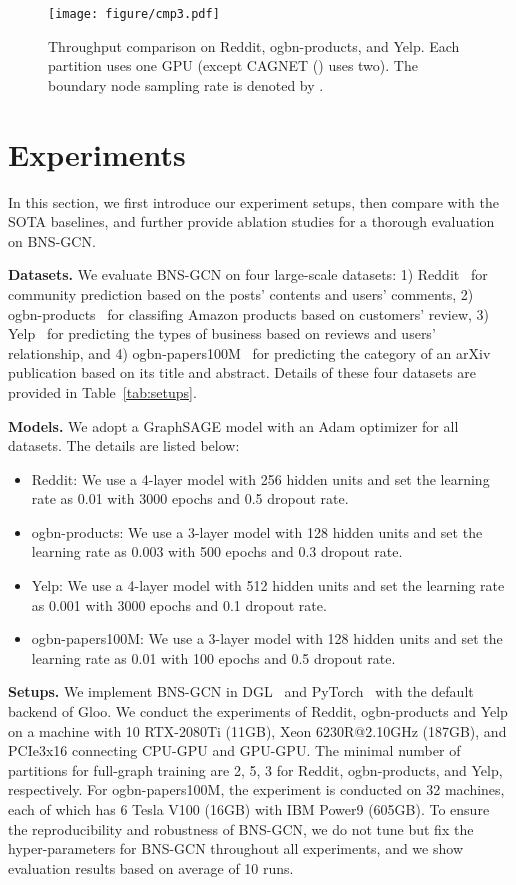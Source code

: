 \documentclass{article}
\newcommand{\niparagraph}[1]{\noindent\textbf{#1}}
\begin{document}
\begin{figure*}
  \centering
  \texttt{[image: figure/cmp3.pdf]}
  \caption{Throughput comparison on Reddit, ogbn-products, and Yelp. Each partition uses one GPU (except CAGNET () uses two). The boundary node sampling rate is denoted by .}
  \label{fig:cmp}
\end{figure*}


\section{Experiments}
\label{sec:experiment}  

In this section, we first introduce our experiment setups, then compare with the SOTA baselines, and further provide ablation studies for a thorough evaluation on BNS-GCN.


\niparagraph{Datasets.} We evaluate BNS-GCN on four large-scale datasets:
1) Reddit~\citep{hamilton2017inductive} for community prediction based on the posts' contents and users' comments,
2) ogbn-products~\citep{hu2020open} for classifing Amazon products based on customers' review,
3) Yelp~\citep{zeng2019graphsaint} for predicting the types of business based on reviews and users' relationship,
and 4) ogbn-papers100M~\citep{hu2020open} for predicting the category of an arXiv publication based on its title and abstract.
Details of these four datasets are provided in Table~\ref{tab:setups}.


\niparagraph{Models.}
\label{sec:model}
We adopt a GraphSAGE model with an Adam optimizer for all datasets. The details are listed below:
\begin{itemize}
    \item Reddit: We use a 4-layer model with 256 hidden units and set the learning rate as 0.01 with 3000 epochs and 0.5 dropout rate.
    \item ogbn-products: We use a 3-layer model with 128 hidden units and set the learning rate as 0.003 with 500 epochs and 0.3 dropout rate.
    \item Yelp: We use a 4-layer model with 512 hidden units and set the learning rate as 0.001 with 3000 epochs and 0.1 dropout rate.
    \item ogbn-papers100M: We use a 3-layer model with 128 hidden units and set the learning rate as 0.01 with 100 epochs and 0.5 dropout rate.
\end{itemize}


\niparagraph{Setups.} 
We implement BNS-GCN in DGL~\citep{wang2019dgl} and PyTorch~\citep{paszke2019pytorch} with the default backend of Gloo. 
We conduct the experiments of Reddit,  ogbn-products and Yelp on a machine with 10 RTX-2080Ti (11GB), Xeon 6230R@2.10GHz (187GB), and PCIe3x16 connecting CPU-GPU and GPU-GPU. 
The minimal number of partitions for full-graph training are 2, 5, 3 for Reddit, ogbn-products, and Yelp, respectively. 
For ogbn-papers100M, the experiment is conducted on 32 machines, each of which has 6 Tesla V100 (16GB) with IBM Power9 (605GB).
To ensure the reproducibility and robustness of BNS-GCN, we do not tune but fix the hyper-parameters for BNS-GCN throughout all experiments, and we show evaluation results based on average of 10 runs.
\end{document}
